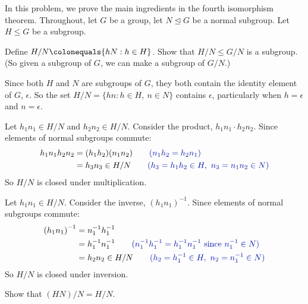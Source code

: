 \begin{problem}
  In this problem, we prove the main ingredients in the fourth isomorphism theorem.  
  Throughout, let $G$ be a group, let $N \trianglelefteq G$ be a normal subgroup.  
  Let $H \leq G$ be a subgroup.  
  \begin{enumalph}
    \item Define $H/N \colonequals \{hN : h \in H\}$.
      Show that $H/N \leq G/N$ is a subgroup.
      (So given a subgroup of $G$, we can make a subgroup of $G/N$.)
      \begin{Answer}
        \begin{enumalph}
          \item Since both $H$ and $N$ are subgroups of $G$, 
            they both contain the identity element of $G$, $\epsilon$.
            So the set $H/N = \{ hn \colon h \in H,\ n \in N \}$ contains $\epsilon$,
            particularly when $h = \epsilon$ and $n = \epsilon$.
          \item Let $h_1n_1 \in H/N$ and $h_2n_2 \in H/N$.
            Consider the product, $h_1n_1 \cdot h_2n_2$.
            Since elements of normal subgroups commute:
            \begin{align*}
              h_1n_1h_2n_2 &= (h_1h_2)(n_1n_2) \qquad \zaff{\text{($n_1h_2 = h_2n_1$)}} \\
              &= h_3n_3 \in H/N \qquad \zaff{\text{($h_3 = h_1h_2 \in H,\ n_3 = n_1n_2 \in N$)}} \\
            \end{align*}
            So $H/N$ is closed under multiplication.
          \item Let $h_1n_1 \in H/N$.
            Consider the inverse, $(h_1n_1)^{-1}$.
            Since elements of normal subgroups commute:
            \begin{align*}
              {(h_1n_1)}^{-1} &= n_1^{-1}h_1^{-1} \\
              &= h_1^{-1}n_1^{-1} \qquad \zaff{\text{($n_1^{-1}h_1^{-1} = h_1^{-1}n_1^{-1}$ since $n_1^{-1} \in N$)}} \\
              &= h_2n_2 \in H/N \qquad \zaff{\text{($h_2 = h_1^{-1} \in H,\ n_2 = n_1^{-1} \in N$)}} \\
            \end{align*}
            So $H/N$ is closed under inversion.
        \end{enumalph}
      \end{Answer}
    \newpage
    \item Show that $(HN)/N=H/N$.

\end{enumalph}
\end{problem}
